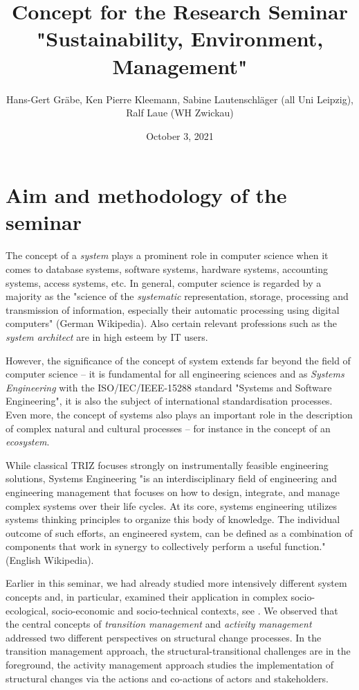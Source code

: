 \documentclass[11pt,a4paper]{article}
\title{Concept for the Research Seminar\\ "Sustainability, Environment,
  Management"}
\author{Hans-Gert Gr\"abe, Ken Pierre Kleemann, Sabine Lautenschläger (all
  Uni Leipzig),\\ Ralf Laue (WH Zwickau) }
\date{October 3, 2021}
\begin{document}
\maketitle

\section{Aim and methodology of the seminar}

The concept of a \emph{system} plays a prominent role in computer science when
it comes to database systems, software systems, hardware systems, accounting
systems, access systems, etc.  In general, computer science is regarded by a
majority as the "science of the \emph{systematic} representation, storage,
processing and transmission of information, especially their automatic
processing using digital computers" (German Wikipedia).  Also certain relevant
professions such as the \emph{system architect} are in high esteem by IT
users.

However, the significance of the concept of system extends far beyond the
field of computer science -- it is fundamental for all engineering sciences
and as \emph{Systems Engineering} with the ISO/IEC/IEEE-15288 standard
"Systems and Software Engineering", it is also the subject of international
standardisation processes.  Even more, the concept of systems also plays an
important role in the description of complex natural and cultural processes --
for instance in the concept of an \emph{ecosystem}.

While classical TRIZ focuses strongly on instrumentally feasible engineering
solutions, Systems Engineering "is an interdisciplinary field of engineering
and engineering management that focuses on how to design, integrate, and
manage complex systems over their life cycles. At its core, systems
engineering utilizes systems thinking principles to organize this body of
knowledge. The individual outcome of such efforts, an engineered system, can
be defined as a combination of components that work in synergy to collectively
perform a useful function." (English Wikipedia). 

Earlier in this seminar, we had already studied more intensively different
system concepts and, in particular, examined their application in complex
socio-ecological, socio-economic and socio-technical contexts, see
\cite{Graebe2020}. We observed that the central concepts of \emph{transition
  management} and \emph{activity management} addressed two different
perspectives on structural change processes. In the transition management
approach, the structural-transitional challenges are in the foreground, the
activity management approach studies the implementation of structural changes
via the actions and co-actions of actors and stakeholders.
\end{document}
